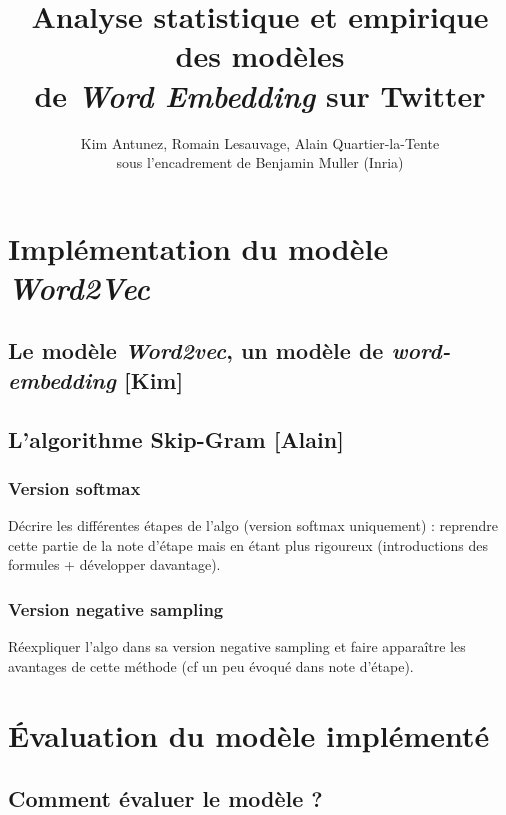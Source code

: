 \documentclass[11pt,french,french]{article}
\title{Analyse statistique et empirique des modèles\\
de \emph{Word Embedding} sur Twitter}
\author{Kim Antunez, Romain Lesauvage, Alain Quartier-la-Tente\\
sous l'encadrement de Benjamin Muller (Inria)}
\date{}
\begin{document}
\maketitle


{
\hypersetup{linkcolor=black}
\setcounter{tocdepth}{3}
\tableofcontents
}
\section{\texorpdfstring{Implémentation du modèle
\emph{Word2Vec}}{Implémentation du modèle Word2Vec}}\label{sec:word2vec}

\subsection{\texorpdfstring{Le modèle \emph{Word2vec}, un modèle de
\emph{word-embedding}
{[}Kim{]}}{Le modèle Word2vec, un modèle de word-embedding {[}Kim{]}}}\label{le-moduxe8le-word2vec-un-moduxe8le-de-word-embedding-kim}

\subsection{L'algorithme Skip-Gram
{[}Alain{]}}\label{lalgorithme-skip-gram-alain}

\subsubsection{Version softmax}\label{version-softmax}

Décrire les différentes étapes de l'algo (version softmax uniquement) :
reprendre cette partie de la note d'étape mais en étant plus rigoureux
(introductions des formules + développer davantage).

\subsubsection{Version negative
sampling}\label{version-negative-sampling}

Réexpliquer l'algo dans sa version negative sampling et faire apparaître
les avantages de cette méthode (cf un peu évoqué dans note d'étape).

\section{Évaluation du modèle
implémenté}\label{uxe9valuation-du-moduxe8le-impluxe9mentuxe9}

\subsection{Comment évaluer le modèle ?}\label{sec:commentEvaluer}
\end{document}
